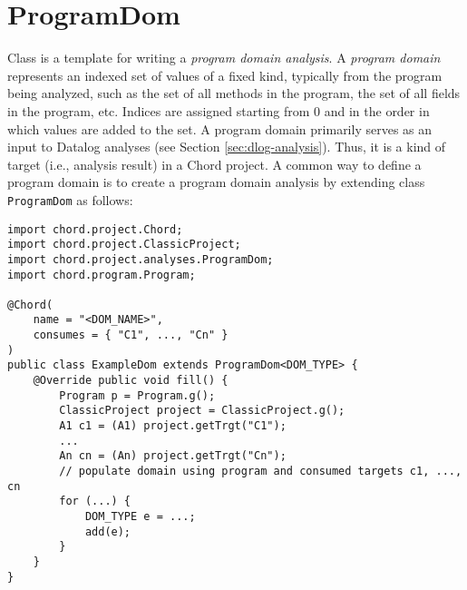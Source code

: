 
\section{ProgramDom}
\label{sec:program-dom}

Class 
is a template for writing a {\it program domain analysis}.
A {\it program domain} represents an indexed set of values of a fixed
kind, typically from the program being analyzed, such as the set of all methods
in the program, the set of all fields in the program, etc.  Indices are 
assigned starting from 0 and in the order in which values are added to the set.
A program domain primarily serves as an input to Datalog analyses
(see Section \ref{sec:dlog-analysis}).  Thus, it is a kind of target (i.e.,
analysis result) in a Chord project.  A common way to define a program domain
is to create a program domain analysis by extending class {\tt ProgramDom} as
follows:

\begin{framed}
\begin{verbatim}
import chord.project.Chord;
import chord.project.ClassicProject;
import chord.project.analyses.ProgramDom;
import chord.program.Program;

@Chord(
    name = "<DOM_NAME>",
    consumes = { "C1", ..., "Cn" }
)
public class ExampleDom extends ProgramDom<DOM_TYPE> {
    @Override public void fill() {
        Program p = Program.g();
        ClassicProject project = ClassicProject.g();
        A1 c1 = (A1) project.getTrgt("C1");
        ...
        An cn = (An) project.getTrgt("Cn");
        // populate domain using program and consumed targets c1, ..., cn
        for (...) {
            DOM_TYPE e = ...;
            add(e); 
        }
    }
}
\end{verbatim}
\end{framed}


